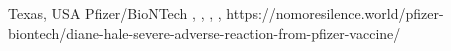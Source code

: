           {Texas, USA}
          {}
          {Pfizer/BioNTech}
          {, }
          {
            ,
            ,
            ,
          }
          {https://nomoresilence.world/pfizer-biontech/diane-hale-severe-adverse-reaction-from-pfizer-vaccine/}


